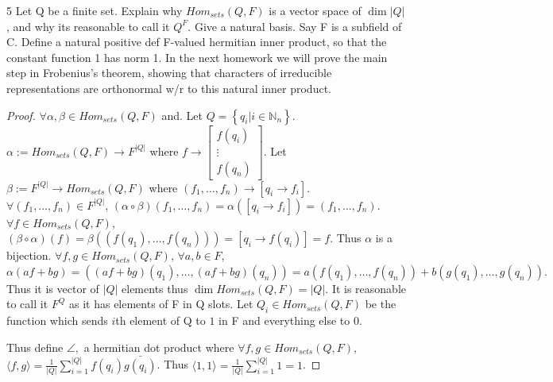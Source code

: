 \documentclass{article}
\newcommand{\N}{\mathbb{N}}
\newcommand{\angles}[1]{\langle #1 \rangle}
\begin{document}
\begin{PROB}{5}\label{Problem 5.}
    Let Q be a finite set. Explain why $Hom_{sets}(Q,F)$ is a vector space of $\dim |Q|$, and why its reasonable to call it $Q^F$. Give a natural basis. Say F is a subfield of C. Define a natural positive def F-valued hermitian inner product, so that the constant function 1 has norm 1.  In the next homework we will prove the main step in Frobenius's theorem, showing that characters of irreducible representations are orthonormal w/r to this natural inner product. 
\end{PROB}
\begin{proof}
    $\forall \alpha, \beta \in Hom_{sets}(Q,F)$ and. Let $Q = \left\{ q_i | i \in \N_n \right\}$. $\alpha := Hom_{sets}(Q, F) \to F^{|Q|}$ where $f \to \begin{bmatrix}
        f(q_i) \\ \vdots \\ f(q_n)
    \end{bmatrix}$. Let $\beta := F^{|Q|} \to Hom_{sets}(Q, F)$ where $(f_1, \dots, f_n) \to [q_i \to f_i]$. $\forall (f_1, \dots, f_n) \in F^{|Q|}$, $(\alpha \circ \beta)(f_1, \dots, f_n) = \alpha([q_i \to f_i]) = (f_1, \dots, f_n)$. $\forall f \in Hom_{sets}(Q, F)$, $(\beta \circ \alpha)(f) = \beta((f(q_1), \dots, f(q_n))) = [q_i \to f(q_i)] = f$. Thus $\alpha$ is a bijection. $\forall f, g \in Hom_{sets}(Q, F)$, $\forall a, b \in F$, $\alpha(af + bg) = ((af + bg)(q_1), \dots, (af + bg)(q_n)) = a(f(q_1), \dots, f(q_n)) + b(g(q_1), \dots, g(q_n)).$ Thus it is vector of $|Q|$ elements thus $\dim Hom_{sets}(Q,F) = |Q|$. It is reasonable to call it $F^Q$ as it has elements of F in Q slots. Let $Q_i \in Hom_{sets}(Q, F)$ be the function which sends $i$th element of Q to $1$ in F and everything else to 0. 
    
    Thus define $\angle{ , }$ a hermitian dot product where $\forall f, g \in Hom_{sets}(Q, F)$, $\angles{f, g} = \frac{1}{|Q|}\sum_{i = 1}^{|Q|}f(q_i)\bar{g(q_i)} $. Thus $\angles{1, 1} = \frac{1}{|Q|} \sum_{i = 1}^{|Q|} 1 = 1$.      
\end{proof}
\end{document}

